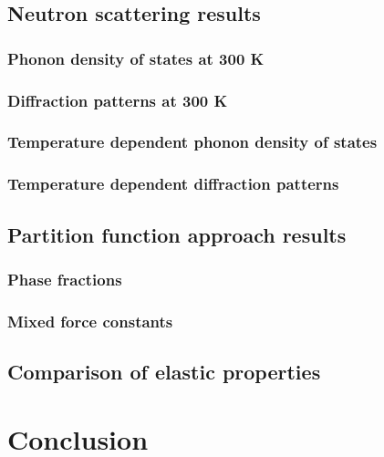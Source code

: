 \subsection{Neutron scattering results}

\subsubsection{Phonon density of states at 300 K}

\subsubsection{Diffraction patterns at 300 K}

\subsubsection{Temperature dependent phonon density of states }

\subsubsection{Temperature dependent diffraction patterns}

\subsection{Partition function approach results}

\subsubsection{Phase fractions}

\subsubsection{Mixed force constants}

\subsection{Comparison of elastic properties}

\section{Conclusion}



